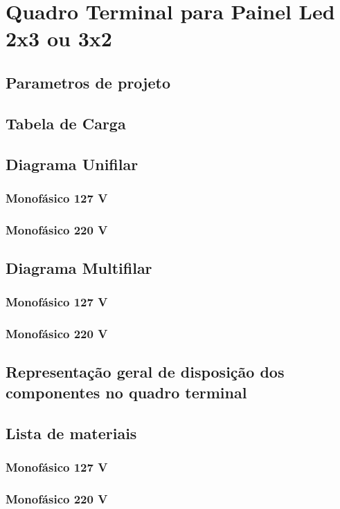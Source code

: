 \section{Quadro Terminal para Painel Led 2x3 ou 3x2}
\subsection{Parametros de projeto}
\subsection{Tabela de Carga}
\subsection{Diagrama Unifilar}
\subsubsection{Monofásico 127 V}
\subsubsection{Monofásico 220 V}

\subsection{Diagrama Multifilar}
\subsubsection{Monofásico 127 V}
\subsubsection{Monofásico 220 V}

\subsection{Representação geral de disposição dos componentes no quadro terminal}

\subsection{Lista de materiais}
\subsubsection{Monofásico 127 V}
\subsubsection{Monofásico 220 V}